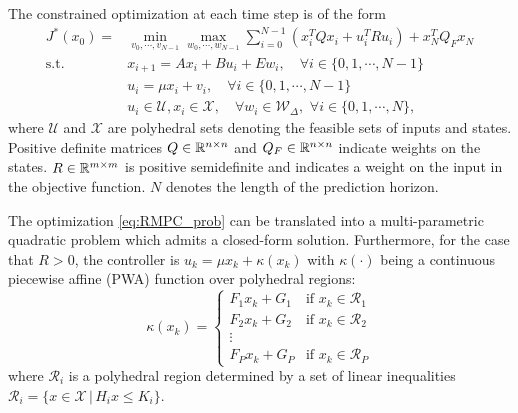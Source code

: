 The constrained optimization at each time step is of the form
\begin{align}
\label{eq:RMPC_prob}
J^{\ast}(x_0)=&\min_{v_0,\cdots,v_{N-1}} \max_{w_0,\cdots,w_{N-1}} \sum_{i=0}^{N-1}(x_i^TQx_i+u_i^TRu_i) + x_N^TQ_Fx_N\nonumber\\
\text{s.t.} \quad &x_{i+1}=Ax_i+Bu_i + E w_i, \quad\forall i\in\{0,1,\cdots,N-1\}\nonumber\\
\quad &u_i=\mu x_i+v_i, \quad\forall i\in\{0,1,\cdots,N-1\}\nonumber\\
&u_i\in\mathcal{U},x_i\in\mathcal{X},\quad \forall w_i\in\mathcal{W}_{\Delta},\,\,\forall i\in\{0,1,\cdots,N\},
\end{align}
%
where $\mathcal U$ and $\mathcal X$ are polyhedral sets denoting the feasible
sets of inputs and states. Positive definite matrices $Q\in\mathbb{R}^{n\times n}$ and
$Q_F\in\mathbb{R}^{n\times n}$ indicate weights on the states. $R\in\mathbb{R}^{m\times m}$ is
positive semidefinite and indicates a weight on the input in the objective function. $N$ denotes the length of the prediction horizon.

\begin{theorem}
\label{thm:EMPC}
The optimization \eqref{eq:RMPC_prob} can be translated into a multi-parametric quadratic problem which admits a closed-form solution. Furthermore, for the case that $R>0$, the controller is $u_k = \mu x_k + \kappa(x_k)$ with $\kappa(\cdot)$ being a continuous piecewise affine (PWA) function over polyhedral regions:
\begin{equation}
\label{eq:affine_map}
\kappa(x_k)=
\begin{cases}
F_1x_k+G_1 & \text{if $x_k\in \mathcal{R}_1$}\\
F_2x_k+G_2 & \text{if $x_k\in \mathcal{R}_2$}\\
\vdots\\
F_Px_k+G_P & \text{if $x_k\in \mathcal{R}_P$}
\end{cases} 
\end{equation}
where $\mathcal{R}_i$ is a polyhedral region determined by a set of linear inequalities $\mathcal R_i = \{x\in\mathcal X\,|\,H_ix\leq K_i\}$.
\end{theorem}

